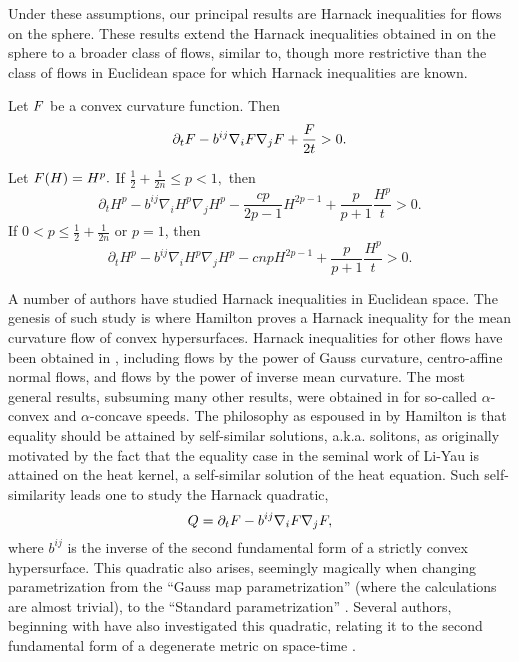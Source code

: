 \documentclass{amsart}
\begin{document}
Under these assumptions, our principal results are Harnack inequalities for flows on the sphere. These results extend the Harnack inequalities obtained in \cite{BryanIvaki:08/2015,BryanLouie:02/2015} on the sphere to a broader class of flows, similar to, though more restrictive than the class of flows in Euclidean space \cite{Andrews:09/1994} for which Harnack inequalities are known.

\begin{theorem}\label{thm:harnack}
Let $F$ be a  convex curvature function. Then
\[
\partial_t F-b^{ij}\nabla_iF\nabla_jF+\frac{F}{2t}>0.
\]

Let $F(H)=H^{p}.$ If $\frac{1}{2}+\frac{1}{2n}\leq {p}< 1,$ then
\[
\partial_t H^{p} - b^{ij}\nabla_iH^{p}\nabla_jH^{p} - \frac{c {p}}{2{p}-1}H^{2{p}-1} + \frac{{p}}{{p}+1} \frac{H^{p}}{t} > 0.
\]
If $0<{p}\leq \frac{1}{2} + \frac{1}{2n}$ or $p=1$, then
\[
\partial_t H^{p} - b^{ij}\nabla_iH^{p}\nabla_jH^{p} - c n{p}H^{2{p}-1} + \frac{{p}}{{p}+1} \frac{H^{p}}{t} > 0.
\]
\end{theorem}

A number of authors have studied Harnack inequalities in Euclidean space. The genesis of such study is \cite{Hamilton:/1995} where Hamilton proves a Harnack inequality for the mean curvature flow of convex hypersurfaces. Harnack inequalities for other flows have been obtained in \cite{Chow:06/1991,Ivaki:11/2015,Ivaki:09/2015,Li:/2011,Schulze:/2005}, including flows by the power of Gauss curvature, centro-affine normal flows, and flows by the power of inverse mean curvature. The most general results, subsuming many other results, were obtained in \cite{Andrews:09/1994} for so-called \(\alpha\)-convex and \(\alpha\)-concave speeds. The philosophy as espoused in \cite{Hamilton:/1995} by Hamilton is that equality should be attained by self-similar solutions, a.k.a. solitons, as originally motivated by the fact that the equality case in the seminal work of Li-Yau \cite{LiYau:/1986} is attained on the heat kernel, a self-similar solution of the heat equation. Such self-similarity leads one to study the Harnack quadratic,
\begin{equation}
\label{eq:harnack_quadratic}
Q = \partial_t F - b^{ij} \nabla_i F \nabla_j F,
\end{equation}
where \(b^{ij}\) is the inverse of the second fundamental form of a strictly convex hypersurface. This quadratic also arises, seemingly magically when changing parametrization from the ``Gauss map parametrization'' (where the calculations are almost trivial), to the ``Standard parametrization'' \cite{Andrews:09/1994}. Several authors, beginning with \cite{ChowChu:06/2001} have also investigated this quadratic, relating it to the second fundamental form of a degenerate metric on space-time \cite{HelmensdorferTopping:01/2013,Kotschwar:/2009}.
\end{document}
